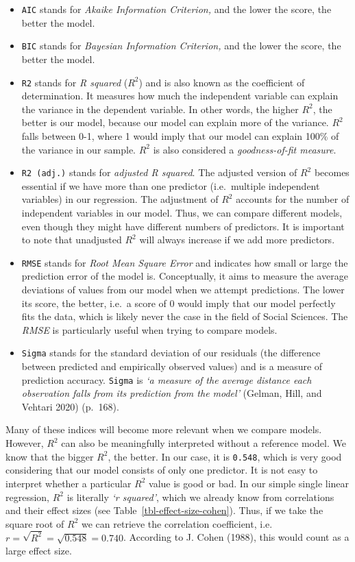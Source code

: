 \documentclass[
  letterpaper,
]{krantz}
\begin{document}
\begin{itemize}
\item
  \texttt{AIC} stands for \emph{Akaike Information Criterion,} and the
  lower the score, the better the model.
\item
  \texttt{BIC} stands for \emph{Bayesian Information Criterion,} and the
  lower the score, the better the model.
\item
  \texttt{R2} stands for \emph{R squared} (\(R^2\)) and is also known as
  the coefficient of determination. It measures how much the independent
  variable can explain the variance in the dependent variable. In other
  words, the higher \(R^2\), the better is our model, because our model
  can explain more of the variance. \(R^2\) falls between 0-1, where 1
  would imply that our model can explain 100\% of the variance in our
  sample. \(R^2\) is also considered a \emph{goodness-of-fit measure}.
\item
  \texttt{R2\ (adj.)} stands for \emph{adjusted R squared}. The adjusted
  version of \(R^2\) becomes essential if we have more than one
  predictor (i.e.~multiple independent variables) in our regression. The
  adjustment of \(R^2\) accounts for the number of independent variables
  in our model. Thus, we can compare different models, even though they
  might have different numbers of predictors. It is important to note
  that unadjusted \(R^2\) will always increase if we add more
  predictors.
\item
  \texttt{RMSE} stands for \emph{Root Mean Square Error} and indicates
  how small or large the prediction error of the model is. Conceptually,
  it aims to measure the average deviations of values from our model
  when we attempt predictions. The lower its score, the better, i.e.~a
  score of 0 would imply that our model perfectly fits the data, which
  is likely never the case in the field of Social Sciences. The
  \emph{RMSE} is particularly useful when trying to compare models.
\item
  \texttt{Sigma} stands for the standard deviation of our residuals (the
  difference between predicted and empirically observed values) and is a
  measure of prediction accuracy. \texttt{Sigma} is \emph{`a measure of
  the average distance each observation falls from its prediction from
  the model'} (Gelman, Hill, and Vehtari 2020) (p.~168).
\end{itemize}

Many of these indices will become more relevant when we compare models.
However, \(R^2\) can also be meaningfully interpreted without a
reference model. We know that the bigger \(R^2\), the better. In our
case, it is \texttt{0.548}, which is very good considering that our
model consists of only one predictor. It is not easy to interpret
whether a particular \(R^2\) value is good or bad. In our simple single
linear regression, \(R^2\) is literally \emph{`r squared'}, which we
already know from correlations and their effect sizes (see
Table~\ref{tbl-effect-size-cohen}). Thus, if we take the square root of
\(R^2\) we can retrieve the correlation coefficient,
i.e.~\(r = \sqrt{R^2} = \sqrt{0.548} = 0.740\). According to J. Cohen
(1988), this would count as a large effect size.
\end{document}
